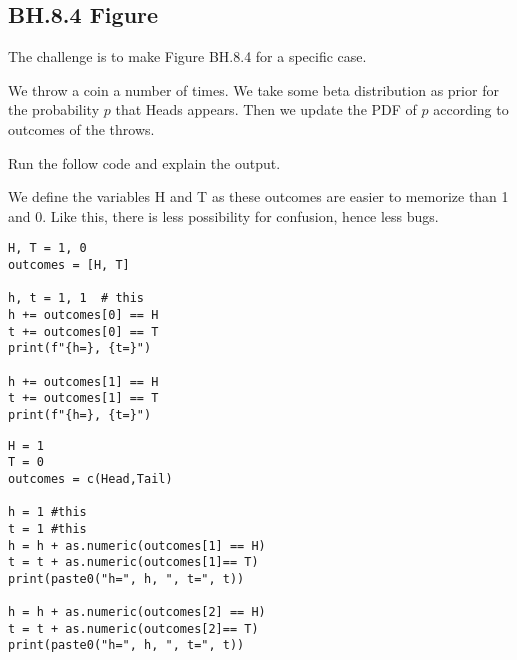 

\subsection{BH.8.4 Figure}
The challenge is to make Figure BH.8.4 for a specific case.

We throw a coin a number of times. We take some beta distribution as prior for the probability $p$ that Heads appears. Then we update the PDF of $p$ according to outcomes of the throws.

\begin{exercise}
Run the follow code and explain the output.

We define the variables H and T as these outcomes are easier to memorize than 1 and 0. Like this, there is less possibility for confusion, hence less bugs.

\begin{verbatim}
H, T = 1, 0
outcomes = [H, T]

h, t = 1, 1  # this
h += outcomes[0] == H
t += outcomes[0] == T
print(f"{h=}, {t=}")

h += outcomes[1] == H
t += outcomes[1] == T
print(f"{h=}, {t=}")
\end{verbatim}

\begin{verbatim}
H = 1
T = 0
outcomes = c(Head,Tail)

h = 1 #this
t = 1 #this
h = h + as.numeric(outcomes[1] == H)
t = t + as.numeric(outcomes[1]== T)
print(paste0("h=", h, ", t=", t))

h = h + as.numeric(outcomes[2] == H)
t = t + as.numeric(outcomes[2]== T)
print(paste0("h=", h, ", t=", t))
\end{verbatim}

\end{exercise}



